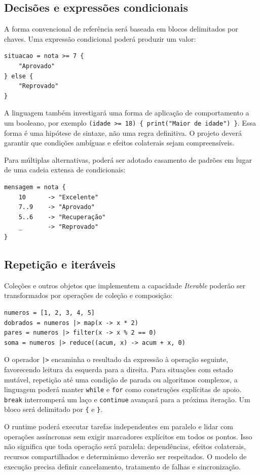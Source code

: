 \documentclass[12pt,a4paper]{article}
\begin{document}
\subsection{Decisões e expressões condicionais}
A forma convencional de referência será baseada em blocos delimitados por chaves. Uma expressão condicional poderá produzir um valor:

\begin{lstlisting}
situacao = nota >= 7 {
    "Aprovado"
} else {
    "Reprovado"
}
\end{lstlisting}

A linguagem também investigará uma forma de aplicação de comportamento a um booleano, por exemplo \texttt{(idade >= 18) \{ print("Maior de idade") \}}. Essa forma é uma hipótese de sintaxe, não uma regra definitiva. O projeto deverá garantir que condições ambíguas e efeitos colaterais sejam compreensíveis.

Para múltiplas alternativas, poderá ser adotado casamento de padrões em lugar de uma cadeia extensa de condicionais:

\begin{lstlisting}
mensagem = nota {
    10      -> "Excelente"
    7..9    -> "Aprovado"
    5..6    -> "Recuperação"
    _       -> "Reprovado"
}
\end{lstlisting}

\subsection{Repetição e iteráveis}
Coleções e outros objetos que implementem a capacidade \textit{Iterable} poderão ser transformados por operações de coleção e composição:

\begin{lstlisting}
numeros = [1, 2, 3, 4, 5]
dobrados = numeros |> map(x -> x * 2)
pares = numeros |> filter(x -> x % 2 == 0)
soma = numeros |> reduce((acum, x) -> acum + x, 0)
\end{lstlisting}

O operador \texttt{|>} encaminha o resultado da expressão à operação seguinte, favorecendo leitura da esquerda para a direita. Para situações com estado mutável, repetição até uma condição de parada ou algoritmos complexos, a linguagem poderá manter \texttt{while} e \texttt{for} como construções explícitas de apoio. \texttt{break} interromperá um laço e \texttt{continue} avançará para a próxima iteração. Um bloco será delimitado por \texttt{\{} e \texttt{\}}.

O runtime poderá executar tarefas independentes em paralelo e lidar com operações assíncronas sem exigir marcadores explícitos em todos os pontos. Isso não significa que toda operação será paralela: dependências, efeitos colaterais, recursos compartilhados e determinismo deverão ser respeitados. O modelo de execução precisa definir cancelamento, tratamento de falhas e sincronização.
\end{document}
